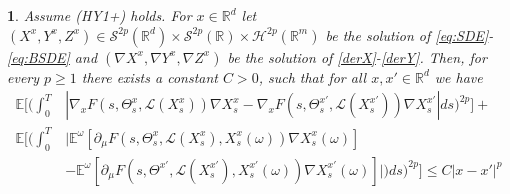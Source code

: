 \documentclass[12,english]{amsart}
\theoremstyle{plain}
\newtheorem{lem}{\protect\lemmaname}
\theoremstyle{definition}
\theoremstyle{plain}
\theoremstyle{plain}
\theoremstyle{remark}
\providecommand{\lemmaname}{Lemma}
\newcommand{\E}{\mathbb E}
\newcommand{\R}{\mathbb R}
\newcommand{\cH}{\mathcal H}
\newcommand{\cL}{\mathcal L}
\newcommand{\cS}{\mathcal S}
\newcommand{\om}{\omega}
\newcommand{\Te}{\Theta}
\begin{document}
\begin{lem}\label{driver}
  Assume (HY1+) holds. For $x\in\R^d$
let $(X^x,Y^x,Z^x)\in\cS^{2p}(\R^d)\times\cS^{2p}(\R)\times\cH^{2p}(\R^m)$
be the solution of \eqref{eq:SDE}-\eqref{eq:BSDE} and $(\nabla X^x,\nabla
Y^x,\nabla Z^x)$ be the solution of \eqref{derX}-\eqref{derY}.
Then, for every
$p\ge 1$ there exists a constant $C>0$, such that for all $x,x'\in\R^d$ we have
\begin{align*}
  \E\Big[\Big(\int_0^T&|\nabla_xF(s,\Te^x_s,\cL(X^x_s)) \nabla X^x_s
    -\nabla_xF(s,\Te_s ^{x'},\cL(X^{x'}_s)) \nabla X^{x'}_s|ds\Big)^{2p} \Big]+\\
\E\Big[\Big(\int_0^T&\big|\E^\om[\partial_\mu F(s,\Te^x_s,\cL(X^x_s), X^x_s(\om))\nabla X^x_s(\om)]
  \\&-\E^\om[\partial_\mu F(s,\Te^{x'},\cL(X^{x'}_s), X^{x'}_s(\om)) \nabla X^{x'}_s(\om)]\big|)ds\Big)^{2p}\Big]\le
C|x-x'|^p
\end{align*}
\end{lem}
\end{document}
